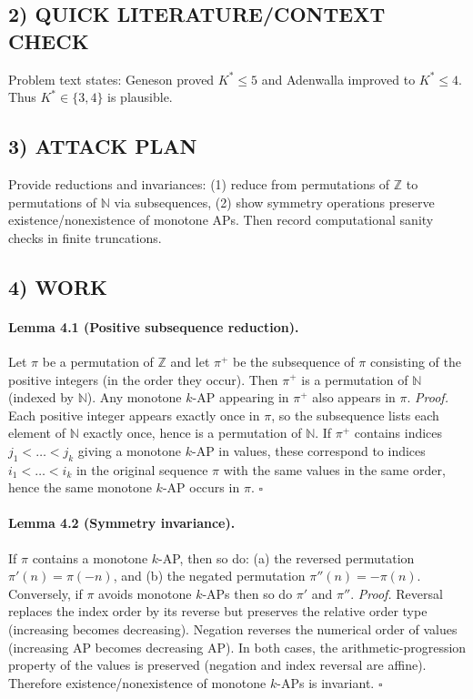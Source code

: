 \subsection*{2) QUICK LITERATURE/CONTEXT CHECK}
Problem text states: Geneson proved $K^*\le 5$ and Adenwalla improved to $K^*\le 4$. Thus $K^*\in\{3,4\}$ is plausible.

\subsection*{3) ATTACK PLAN}
Provide reductions and invariances:
(1) reduce from permutations of $\mathbb{Z}$ to permutations of $\mathbb{N}$ via subsequences,
(2) show symmetry operations preserve existence/nonexistence of monotone APs.
Then record computational sanity checks in finite truncations.

\subsection*{4) WORK}

\paragraph{Lemma 4.1 (Positive subsequence reduction).}
Let $\pi$ be a permutation of $\mathbb{Z}$ and let $\pi^+$ be the subsequence of $\pi$ consisting of the positive integers (in the order they occur).
Then $\pi^+$ is a permutation of $\mathbb{N}$ (indexed by $\mathbb{N}$). Any monotone $k$-AP appearing in $\pi^+$ also appears in $\pi$.
\textit{Proof.}
Each positive integer appears exactly once in $\pi$, so the subsequence lists each element of $\mathbb{N}$ exactly once, hence is a permutation of $\mathbb{N}$.
If $\pi^+$ contains indices $j_1<\dots<j_k$ giving a monotone $k$-AP in values, these correspond to indices $i_1<\dots<i_k$ in the original sequence $\pi$
with the same values in the same order, hence the same monotone $k$-AP occurs in $\pi$. \hfill$\square$

\paragraph{Lemma 4.2 (Symmetry invariance).}
If $\pi$ contains a monotone $k$-AP, then so do:
(a) the reversed permutation $\pi'(n)=\pi(-n)$, and
(b) the negated permutation $\pi''(n)=-\pi(n)$.
Conversely, if $\pi$ avoids monotone $k$-APs then so do $\pi'$ and $\pi''$.
\textit{Proof.}
Reversal replaces the index order by its reverse but preserves the relative order type (increasing becomes decreasing).
Negation reverses the numerical order of values (increasing AP becomes decreasing AP).
In both cases, the arithmetic-progression property of the values is preserved (negation and index reversal are affine).
Therefore existence/nonexistence of monotone $k$-APs is invariant. \hfill$\square$

